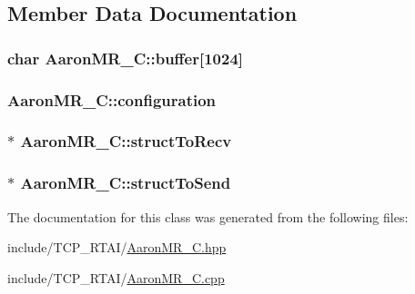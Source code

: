 \subsection{Member Data Documentation}
\hypertarget{classAaronMR__C_ab43e09c741489a54adfa0c2ec4668ea1}{
\subsubsection[{buffer}]{\setlength{\rightskip}{0pt plus 5cm}char {\bf AaronMR\_\-C::buffer}\mbox{[}1024\mbox{]}}}
\label{classAaronMR__C_ab43e09c741489a54adfa0c2ec4668ea1}
\hypertarget{classAaronMR__C_a5ab3b59be1481053d992e28e0b77be4d}{
\subsubsection[{configuration}]{ {\bf AaronMR\_\-C::configuration}}}
\label{classAaronMR__C_a5ab3b59be1481053d992e28e0b77be4d}
\hypertarget{classAaronMR__C_ad52bc3b2c87324f45d8c3e72a005bf0a}{
\subsubsection[{structToRecv}]{$\ast$ {\bf AaronMR\_\-C::structToRecv}}}
\label{classAaronMR__C_ad52bc3b2c87324f45d8c3e72a005bf0a}
\hypertarget{classAaronMR__C_aef5db1ac136b77c2252b8c67b107b0ef}{
\subsubsection[{structToSend}]{$\ast$ {\bf AaronMR\_\-C::structToSend}}}
\label{classAaronMR__C_aef5db1ac136b77c2252b8c67b107b0ef}


The documentation for this class was generated from the following files:\begin{DoxyCompactItemize}
\item 
include/TCP\_\-RTAI/\hyperlink{AaronMR__C_8hpp}{AaronMR\_\-C.hpp}\item 
include/TCP\_\-RTAI/\hyperlink{AaronMR__C_8cpp}{AaronMR\_\-C.cpp}\end{DoxyCompactItemize}
